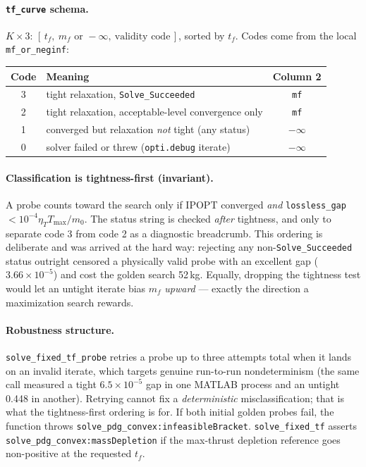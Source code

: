 \documentclass[11pt]{article}
\newcommand{\Tmax}{T_{\max}}
\newcommand{\etaT}{\eta_T}
\begin{document}
\paragraph{\texttt{tf\_curve} schema.} $K\times3$:
$[\,t_f,\ m_f\text{ or }-\infty,\ \text{validity code}\,]$, sorted by $t_f$.
Codes come from the local \texttt{mf\_or\_neginf}:

\begin{center}
\begin{tabular}{@{}clc@{}}
\toprule
Code & Meaning & Column 2 \\
\midrule
3 & tight relaxation, \texttt{Solve\_Succeeded} & \texttt{mf} \\
2 & tight relaxation, acceptable-level convergence only & \texttt{mf} \\
1 & converged but relaxation \emph{not} tight (any status) & $-\infty$ \\
0 & solver failed or threw (\texttt{opti.debug} iterate) & $-\infty$ \\
\bottomrule
\end{tabular}
\end{center}

\paragraph{Classification is tightness-first (invariant).} A probe counts
toward the search only if IPOPT converged \emph{and}
\texttt{lossless\_gap} $< 10^{-4}\etaT\Tmax/m_0$. The status string is
checked \emph{after} tightness, and only to separate code 3 from code 2 as a
diagnostic breadcrumb. This ordering is deliberate and was arrived at the
hard way: rejecting any non-\texttt{Solve\_Succeeded} status outright
censored a physically valid probe with an excellent gap
($3.66\times10^{-5}$) and cost the golden search 52\,kg. Equally, dropping
the tightness test would let an untight iterate bias $m_f$ \emph{upward} ---
exactly the direction a maximization search rewards.

\paragraph{Robustness structure.} \texttt{solve\_fixed\_tf\_probe} retries a
probe up to three attempts total when it lands on an invalid iterate, which
targets genuine run-to-run nondeterminism (the same call measured a tight
$6.5\times10^{-5}$ gap in one MATLAB process and an untight 0.448 in
another). Retrying cannot fix a \emph{deterministic} misclassification;
that is what the tightness-first ordering is for. If both initial golden
probes fail, the function throws
\texttt{solve\_pdg\_convex:infeasibleBracket}. \texttt{solve\_fixed\_tf}
asserts \texttt{solve\_pdg\_convex:massDepletion} if the max-thrust
depletion reference goes non-positive at the requested $t_f$.
\end{document}
